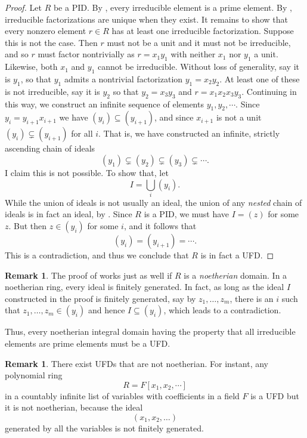 \documentclass[12pt]{report}
\numberwithin{equation}{section}
\numberwithin{theorem}{chapter}
\theoremstyle{definition}
\newtheorem*{basic properties}{Basic Properties}
\newtheorem*{Important Remark}{Important Remark}
\newtheorem{remark}[theorem]{Remark}
\begin{document}
\begin{proof} 
Let $R$ be a PID.
By , every irreducible element is a prime element.
By , irreducible factorizations are unique when they exist. 
It remains to show that every nonzero element $r \in R$ has at least one irreducible factorization. Suppose this is not the case. Then $r$ must not be a unit and it must not be irreducible, and so $r$ must factor nontrivially as $r =x_1 y_1$ with neither $x_1$ nor $y_1$ a unit. Likewise, both $x_1$ and $y_1$ cannot be irreducible. Without loss of generality, say it is $y_1$, so that $y_1$ admits a nontrivial factorization $y_1 = x_2 y_2$. At least one of these is not irreducible, say it is $y_2$ so that $y_2 = x_3 y_3$ and $r = x_1x_2x_3y_3$. 
Continuing in this way, we construct an infinite sequence of elements $y_1, y_2, \cdots$.
Since $y_i = y_{i+1}x_{i+1}$ we have $(y_i) \subseteq (y_{i+1})$, and since $x_{i+1}$ is not a unit $(y_i) \subsetneq (y_{i+1})$ for all $i$.
That is, we have constructed an infinite, strictly ascending chain of ideals
$$(y_1) \subsetneq (y_2) \subsetneq (y_3) \subsetneq \cdots.$$
I claim this is not possible. To show that, let 
$$I = \bigcup_i (y_i).$$ 
While the union of ideals is not usually an ideal, the union of any {\em nested} chain of ideals is in fact an ideal, by . Since $R$ is a PID, we must have $I = (z)$ for some $z$. But then $z \in (y_i)$ for
some $i$, and it follows that 
$$(y_i) = (y_{i+1}) = \cdots.$$
This is a contradiction, and thus we conclude that $R$ is in fact a UFD.
\end{proof}


\begin{remark} 
The proof of  works just as well if $R$ is a {\em noetherian} domain. In a noetherian ring, every ideal is finitely generated. In fact, as long as the ideal $I$ constructed in the proof is finitely generated, say by $z_1, \dots, z_m$, there is an $i$ such that $z_1, \dots, z_m \in (y_i)$ and hence $I \subseteq (y_i)$, which leads to a contradiction.

Thus,  every noetherian integral domain having the property that all  irreducible elements are prime elements must be a UFD.
\end{remark}


\begin{remark}
There exist UFDs that are not noetherian. For instant, any polynomial ring 
$$R = F[x_1, x_2, \cdots]$$ 
in a countably infinite list of variables with coefficients in a field $F$ is a UFD but it is not noetherian, because the ideal
$$(x_1, x_2, \ldots)$$	
generated by all the variables is not finitely generated.
\end{remark}
\end{document}
